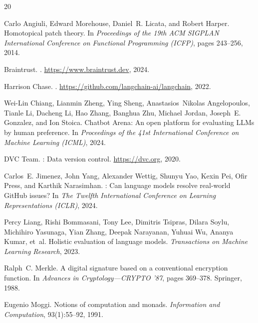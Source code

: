 \documentclass{article}
\begin{document}
\begin{thebibliography}{20}

Carlo Angiuli, Edward Morehouse, Daniel~R. Licata, and Robert Harper.
\newblock Homotopical patch theory.
\newblock In \emph{Proceedings of the 19th ACM SIGPLAN International Conference
  on Functional Programming (ICFP)}, pages 243--256, 2014.

Braintrust.
.
\newblock \url{https://www.braintrust.dev}, 2024.

Harrison Chase.
.
\newblock \url{https://github.com/langchain-ai/langchain}, 2022.

Wei-Lin Chiang, Lianmin Zheng, Ying Sheng, Anastasios~Nikolas Angelopoulos,
  Tianle Li, Dacheng Li, Hao Zhang, Banghua Zhu, Michael Jordan,
  Joseph~E. Gonzalez, and Ion Stoica.
\newblock Chatbot {Arena}: An open platform for evaluating {LLMs} by human
  preference.
\newblock In \emph{Proceedings of the 41st International Conference on Machine
  Learning (ICML)}, 2024.

{DVC Team}.
: Data version control.
\newblock \url{https://dvc.org}, 2020.

Carlos~E. Jimenez, John Yang, Alexander Wettig, Shunyu Yao, Kexin Pei, Ofir
  Press, and Karthik Narasimhan.
: Can language models resolve real-world {GitHub} issues?
\newblock In \emph{The Twelfth International Conference on Learning
  Representations (ICLR)}, 2024.

Percy Liang, Rishi Bommasani, Tony Lee, Dimitris Tsipras, Dilara Soylu,
  Michihiro Yasunaga, Yian Zhang, Deepak Narayanan, Yuhuai Wu, Ananya Kumar,
  et~al.
\newblock Holistic evaluation of language models.
\newblock \emph{Transactions on Machine Learning Research}, 2023.

Ralph~C. Merkle.
\newblock A digital signature based on a conventional encryption function.
\newblock In \emph{Advances in Cryptology---CRYPTO '87}, pages 369--378.
  Springer, 1988.

Eugenio Moggi.
\newblock Notions of computation and monads.
\newblock \emph{Information and Computation}, 93(1):55--92, 1991.


\end{thebibliography}
\end{document}
